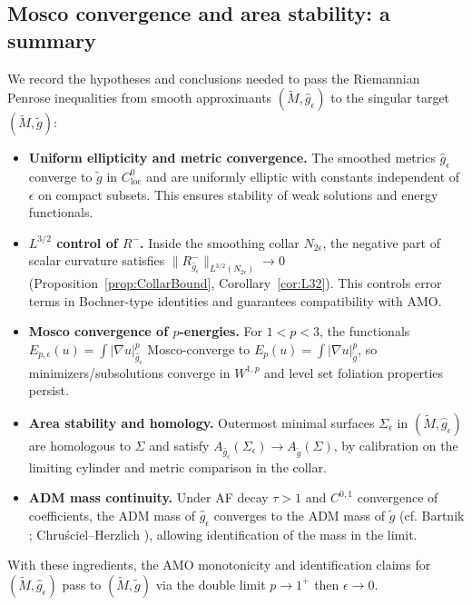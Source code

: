 \subsection{Mosco convergence and area stability: a summary}\label{sec:MoscoSummary}
We record the hypotheses and conclusions needed to pass the Riemannian Penrose inequalities from smooth approximants $(\widetilde M, \hat g_\epsilon)$ to the singular target $(\widetilde M, \widetilde g)$:
\begin{itemize}
    \item \textbf{Uniform ellipticity and metric convergence.} The smoothed metrics $\hat g_\epsilon$ converge to $\widetilde g$ in $C^0_{\mathrm{loc}}$ and are uniformly elliptic with constants independent of $\epsilon$ on compact subsets. This ensures stability of weak solutions and energy functionals.
    \item \textbf{$L^{3/2}$ control of $R^-$.} Inside the smoothing collar $N_{2\epsilon}$, the negative part of scalar curvature satisfies $\|R_{\hat g_\epsilon}^-\|_{L^{3/2}(N_{2\epsilon})}\to 0$ (Proposition~\ref{prop:CollarBound}, Corollary~\ref{cor:L32}). This controls error terms in Bochner-type identities and guarantees compatibility with AMO.
    \item \textbf{Mosco convergence of $p$-energies.} For $1<p<3$, the functionals $E_{p,\epsilon}(u)=\int |\nabla u|_{\hat g_\epsilon}^p$ Mosco-converge to $E_p(u)=\int |\nabla u|_{\widetilde g}^p$, so minimizers/subsolutions converge in $W^{1,p}$ and level set foliation properties persist.
    \item \textbf{Area stability and homology.} Outermost minimal surfaces $\Sigma_\epsilon$ in $(\widetilde M,\hat g_\epsilon)$ are homologous to $\Sigma$ and satisfy $A_{\hat g_\epsilon}(\Sigma_\epsilon) \to A_{\widetilde g}(\Sigma)$, by calibration on the limiting cylinder and metric comparison in the collar.
    \item \textbf{ADM mass continuity.} Under AF decay $\tau>1$ and $C^{0,1}$ convergence of coefficients, the ADM mass of $\hat g_\epsilon$ converges to the ADM mass of $\widetilde g$ (cf. Bartnik \cite{bartnik1986}; Chru\'sciel--Herzlich \cite{chruscielherrzlich2003}), allowing identification of the mass in the limit.
\end{itemize}
With these ingredients, the AMO monotonicity and identification claims for $(\widetilde M,\hat g_\epsilon)$ pass to $(\widetilde M,\widetilde g)$ via the double limit $p\to 1^+$ then $\epsilon\to 0$.

